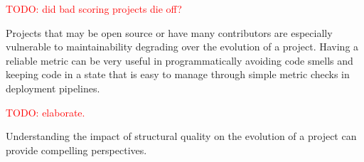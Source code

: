 \documentclass[12pt,conference]{IEEEtran}
\newcommand\todo[1]{\textcolor{red}{#1}}
\begin{document}
\todo{TODO: did bad scoring projects die off?}

Projects that may be open source or have many contributors are especially vulnerable to maintainability degrading over the evolution of a project. Having a reliable metric can be very useful in programmatically avoiding code smells and keeping code in a state that is easy to manage through simple metric checks in deployment pipelines.

\todo{TODO: elaborate.}

Understanding the impact of structural quality on the evolution of a project can provide compelling perspectives.

\newpage



\end{document}
